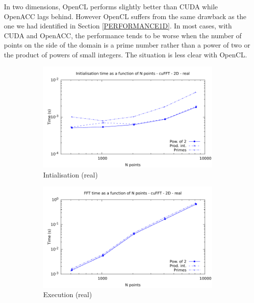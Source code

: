 \documentclass[12pt, a4paper]{article}
\begin{document}
In two dimensions, OpenCL performs slightly better than CUDA while OpenACC lags behind. However OpenCL suffers from the same drawback as the one we had identified in Section \ref{PERFORMANCE1D}. In most cases, with CUDA and OpenACC, the performance tends to be worse when the number of points on the side of the domain is a prime number rather than a power of two or the product of powers of small integers. The situation is less clear with OpenCL.

\begin{figure}[H]
\captionsetup{width=0.8\linewidth}
\centering
\begin{subfigure}{.5\textwidth}
\centering
\includegraphics[width=.9\linewidth]{graphs/fft-cuda-2d-pow2-r-init.pdf}
\caption{Intialisation (real)}
\label{FFTCUDA2DRI}
\end{subfigure}%
\begin{subfigure}{.5\textwidth}
\centering
\includegraphics[width=.9\linewidth]{graphs/fft-cuda-2d-pow2-r-exec.pdf}
\caption{Execution (real)}
\label{FFTCUDA2DRE}
\end{subfigure}\\
\begin{subfigure}{.5\textwidth}

\end{subfigure}
\end{figure}
\end{document}
